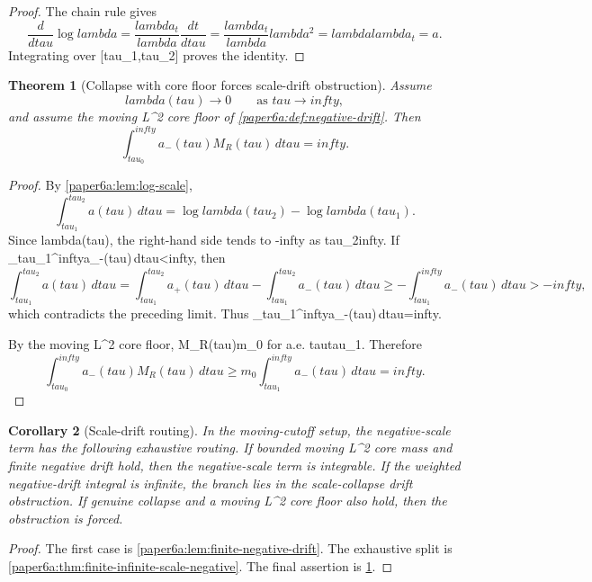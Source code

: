 \documentclass[11pt]{amsart}
\def\({}%
\def\){}%
\def\tau{tau}%
\def\lambda{lambda}%
\def\infty{infty}%
\theoremstyle{plain}
\newtheorem{theorem}{Theorem}[section]
\newtheorem{corollary}[theorem]{Corollary}
\theoremstyle{definition}
\theoremstyle{remark}
\begin{document}
\begin{proof}
The chain rule gives
\[
  \frac{d}{d\tau}\log\lambda
  =
  \frac{\lambda_t}{\lambda}\frac{dt}{d\tau}
  =
  \frac{\lambda_t}{\lambda}\lambda^2
  =
  \lambda\lambda_t=a.
\]
Integrating over \([\tau_1,\tau_2]\) proves the identity.
\end{proof}

\begin{theorem}[Collapse with core floor forces scale-drift obstruction]
\label{paper6a:thm:collapse-core-floor}
Assume
\[
  \lambda(\tau)\to0\qquad\text{as }\tau\to\infty,
\]
and assume the moving \(L^2\) core floor of
\cref{paper6a:def:negative-drift}.  Then
\[
  \int_{\tau_0}^{\infty}a_-(\tau)M_R(\tau)\,d\tau=\infty .
\]
\end{theorem}

\begin{proof}
By \cref{paper6a:lem:log-scale},
\[
  \int_{\tau_1}^{\tau_2}a(\tau)\,d\tau
  =
  \log\lambda(\tau_2)-\log\lambda(\tau_1).
\]
Since \(\lambda(\tau)\), the right-hand side tends to \(-\infty\) as
\(\tau_2\to\infty\).  If
\(\int_{\tau_1}^{\infty}a_-(\tau)\,d\tau<\infty\), then
\[
  \int_{\tau_1}^{\tau_2}a(\tau)\,d\tau
  =
  \int_{\tau_1}^{\tau_2}a_+(\tau)\,d\tau
  -
  \int_{\tau_1}^{\tau_2}a_-(\tau)\,d\tau
  \ge
  -\int_{\tau_1}^{\infty}a_-(\tau)\,d\tau>-\infty,
\]
which contradicts the preceding limit.  Thus
\(\int_{\tau_1}^{\infty}a_-(\tau)\,d\tau=\infty\).

By the moving \(L^2\) core floor, \(M_R(\tau)\ge m_0\) for a.e.
\(\tau\ge\tau_1\).  Therefore
\[
  \int_{\tau_0}^{\infty}a_-(\tau)M_R(\tau)\,d\tau
  \ge
  m_0\int_{\tau_1}^{\infty}a_-(\tau)\,d\tau
  =
  \infty.
\]
\end{proof}

\begin{corollary}[Scale-drift routing]\label{paper6a:cor:scale-drift-routing}
In the moving-cutoff setup, the negative-scale term has the following
exhaustive routing.  If bounded moving \(L^2\) core mass and finite negative
drift hold, then the negative-scale term is integrable.  If the weighted
negative-drift integral is infinite, the branch lies in the scale-collapse
drift obstruction.  If genuine collapse and a moving \(L^2\) core floor also
hold, then the obstruction is forced.
\end{corollary}

\begin{proof}
The first case is \cref{paper6a:lem:finite-negative-drift}.  The exhaustive
split is \cref{paper6a:thm:finite-infinite-scale-negative}.  The final
assertion is \cref{paper6a:thm:collapse-core-floor}.
\end{proof}
\end{document}
